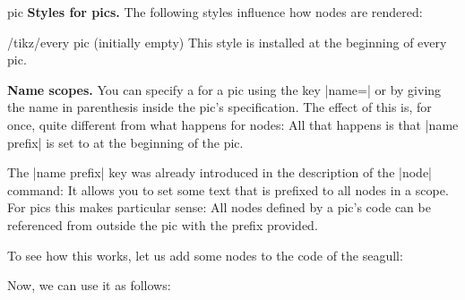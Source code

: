 \begin{pathoperation}{pic}
    \medskip
    \textbf{Styles for pics.}
    The following styles influence how nodes are rendered:
    \begin{stylekey}{/tikz/every pic (initially \normalfont empty)}
        This style is installed at the beginning of every pic.
\begin{codeexample}[
    pre={\tikzset{
  seagull/.pic={
    \draw (-3mm,0) to [bend left] (0,0) to [bend left] (3mm,0);
  },
}}]
\end{codeexample}
    \end{stylekey}

    \medskip
    \textbf{Name scopes.}
    You can specify a  for a pic using the key |name=| or
    by giving the name in parenthesis inside the pic's specification. The
    effect of this is, for once, quite different from what happens for nodes:
    All that happens is that |name prefix| is set to  at the
    beginning of the pic.

    The |name prefix| key was already introduced in the description of the
    |node| command: It allows you to set some text that is prefixed to all
    nodes in a scope. For pics this makes particular sense: All nodes defined
    by a pic's code can be referenced from outside the pic with the prefix
    provided.

    To see how this works, let us add some nodes to the code of the seagull:
\begin{codeexample}
\end{codeexample}

    Now, we can use it as follows:
\begin{codeexample}
\end{codeexample}
\end{pathoperation}
